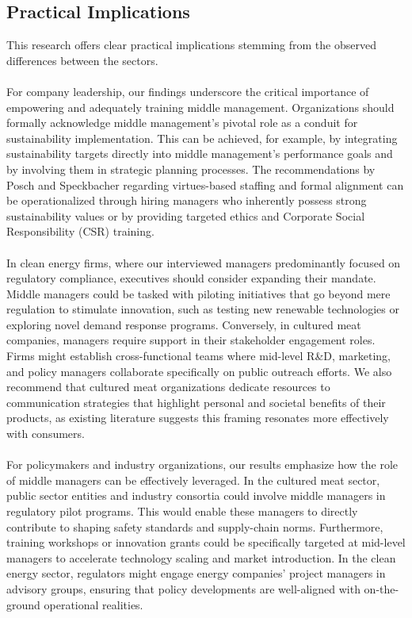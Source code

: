 	\subsection{Practical Implications}
	This research offers clear practical implications stemming from the observed differences between the sectors.
	
	\paragraph*{} For company leadership, our findings underscore the critical importance of empowering and adequately training middle management. Organizations should formally acknowledge middle management's pivotal role as a conduit for sustainability implementation. This can be achieved, for example, by integrating sustainability targets directly into middle management's performance goals and by involving them in strategic planning processes. The recommendations by Posch and Speckbacher regarding virtues-based staffing and formal alignment can be operationalized through hiring managers who inherently possess strong sustainability values or by providing targeted ethics and Corporate Social Responsibility (CSR) training.
	
	\paragraph*{} In clean energy firms, where our interviewed managers predominantly focused on regulatory compliance, executives should consider expanding their mandate. Middle managers could be tasked with piloting initiatives that go beyond mere regulation to stimulate innovation, such as testing new renewable technologies or exploring novel demand response programs. Conversely, in cultured meat companies, managers require support in their stakeholder engagement roles. Firms might establish cross-functional teams where mid-level R\&D, marketing, and policy managers collaborate specifically on public outreach efforts. We also recommend that cultured meat organizations dedicate resources to communication strategies that highlight personal and societal benefits of their products, as existing literature suggests this framing resonates more effectively with consumers.
	
	\paragraph*{} For policymakers and industry organizations, our results emphasize how the role of middle managers can be effectively leveraged. In the cultured meat sector, public sector entities and industry consortia could involve middle managers in regulatory pilot programs. This would enable these managers to directly contribute to shaping safety standards and supply-chain norms. Furthermore, training workshops or innovation grants could be specifically targeted at mid-level managers to accelerate technology scaling and market introduction. In the clean energy sector, regulators might engage energy companies' project managers in advisory groups, ensuring that policy developments are well-aligned with on-the-ground operational realities.
	
